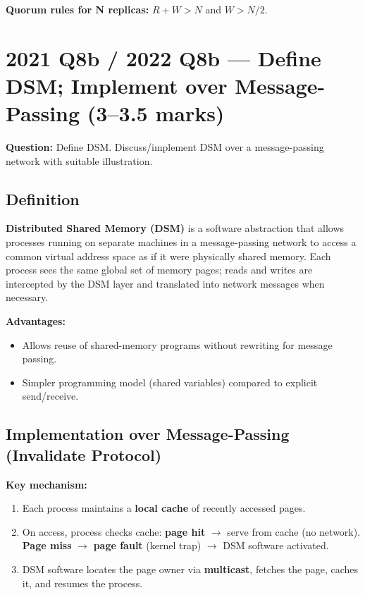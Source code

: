 \documentclass[12pt,a4paper]{article}
\begin{document}
\textbf{Quorum rules for N replicas:} $R + W > N$ and $W > N/2$.

\section{2021 Q8b / 2022 Q8b --- Define DSM; Implement over Message-Passing (3--3.5 marks)}

\textbf{Question:} Define DSM. Discuss/implement DSM over a message-passing network with suitable illustration.

\subsection*{Definition}

\textbf{Distributed Shared Memory (DSM)} is a software abstraction that allows processes running on separate machines in a message-passing network to access a common virtual address space as if it were physically shared memory. Each process sees the same global set of memory pages; reads and writes are intercepted by the DSM layer and translated into network messages when necessary.

\textbf{Advantages:}
\begin{itemize}[noitemsep]
  \item Allows reuse of shared-memory programs without rewriting for message passing.
  \item Simpler programming model (shared variables) compared to explicit send/receive.
\end{itemize}

\subsection*{Implementation over Message-Passing (Invalidate Protocol)}

\textbf{Key mechanism:}
\begin{enumerate}[noitemsep]
  \item Each process maintains a \textbf{local cache} of recently accessed pages.
  \item On access, process checks cache: \textbf{page hit} $\to$ serve from cache (no network). \textbf{Page miss} $\to$ \textbf{page fault} (kernel trap) $\to$ DSM software activated.
  \item DSM software locates the page owner via \textbf{multicast}, fetches the page, caches it, and resumes the process.
\end{enumerate}
\end{document}
